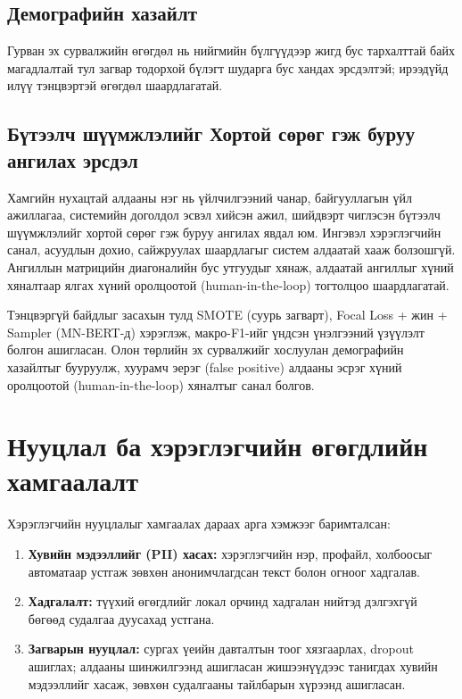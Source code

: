 \subsection{Демографийн хазайлт}
\label{sec:demographic-bias}

Гурван эх сурвалжийн өгөгдөл нь нийгмийн бүлгүүдээр жигд бус тархалттай байх магадлалтай тул загвар тодорхой бүлэгт шударга бус хандах эрсдэлтэй; ирээдүйд илүү тэнцвэртэй өгөгдөл шаардлагатай.

\subsection{Бүтээлч шүүмжлэлийг Хортой сөрөг гэж буруу ангилах эрсдэл}
\label{sec:false-positive-risk}

Хамгийн нухацтай алдааны нэг нь үйлчилгээний чанар, байгууллагын үйл ажиллагаа, системийн доголдол эсвэл хийсэн ажил, шийдвэрт чиглэсэн бүтээлч шүүмжлэлийг хортой сөрөг гэж буруу ангилах явдал юм. Ингэвэл хэрэглэгчийн санал, асуудлын дохио, сайжруулах шаардлагыг систем алдаатай хааж болзошгүй. Ангиллын матрицийн диагоналийн бус утгуудыг хянаж, алдаатай ангиллыг хүний хяналтаар ялгах хүний оролцоотой (human-in-the-loop) тогтолцоо шаардлагатай.

Тэнцвэргүй байдлыг засахын тулд SMOTE (суурь загварт), Focal Loss + жин + Sampler (MN-BERT-д) хэрэглэж, макро-F1-ийг үндсэн үнэлгээний үзүүлэлт болгон ашигласан. Олон төрлийн эх сурвалжийг хослуулан демографийн хазайлтыг бууруулж, хуурамч эерэг (false positive) алдааны эсрэг хүний оролцоотой (human-in-the-loop) хяналтыг санал болгов.

\section{Нууцлал ба хэрэглэгчийн өгөгдлийн хамгаалалт}

Хэрэглэгчийн нууцлалыг хамгаалах дараах арга хэмжээг баримталсан:

\begin{enumerate}
  \item \textbf{Хувийн мэдээллийг (PII) хасах:} хэрэглэгчийн нэр, профайл, холбоосыг автоматаар устгаж зөвхөн анонимчлагдсан текст болон огноог хадгалав.
  \item \textbf{Хадгалалт:} түүхий өгөгдлийг локал орчинд хадгалан нийтэд дэлгэхгүй бөгөөд судалгаа дуусахад устгана.
  \item \textbf{Загварын нууцлал:} сургах үеийн давталтын тоог хязгаарлах, dropout ашиглах; алдааны шинжилгээнд ашигласан жишээнүүдээс танигдах хувийн мэдээллийг хасаж, зөвхөн судалгааны тайлбарын хүрээнд ашигласан.
\end{enumerate}

